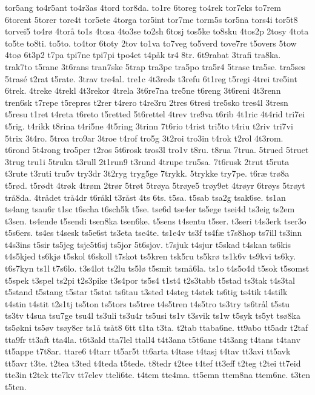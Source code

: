{tor5ang
to4r5ant
to4r3as
4tord
tor8da.
to1re
6toreg
to4rek
tor7eks
to7rem
6torent
5torer
tore4t
tor5ete
4torga
tor5int
tor7me
torm5s
tor5na
tors4i
tor5t8
torvei5
to4rø
4torå
to1s
4tosa
4to3se
to2sh
6tosj
tos5ke
to8sku
4tos2p
2tosy
4tota
to5te
to8ti.
to5to.
to4tor
6toty
2tov
to1va
to7veg
to5verd
tove7re
t5overs
5tow
4toø
6t3p2
t7pa
tpi7ne
tpi7pi
tpo4et
t4påk
tr4
8tr.
6t9rabat
3trafi
tra8ka.
trak7to
t5rane
3t6rans
tran7ske
5trap
tra3pe
tra5po
tra5r4
5trase
tra5se.
tra5ses
5trasé
t2rat
t5rate.
3trav
tre4al.
tre1c
4t3reds
t3refu
6t1reg
t5regi
4trei
tre5int
6trek.
4treke
4trekl
4t3rekor
4trela
3t6re7na
tre5ne
t6reng
3t6reni
4t3renn
tren6sk
t7repe
t5repres
t2rer
t4rero
t4re3ru
2tres
6tresi
tre5sko
tres4l
3tresn
t5resu
t1ret
t4reta
t6reto
t5retted
5t6rettel
4trev
tre9va
t6rib
4t1ric
4t4rid
tri7ei
t5rig.
t4rikk
t8rina
t4ri5ne
4t5ring
3trinn
7t6rio
t4rist
tri5to
t4riu
t2riv
tri7vi
5trix
3t4ro.
5troa
tro9ar
3troe
t4rof
tro5g
3t2roi
tro3in
t4rok
t2rol
4t3rom.
t6rond
5t4rong
tro5per
t2ros
5t6rosk
tros3l
tro1v
t8ru.
t8rua
7trua.
5trued
5truet
3trug
tru1i
5trukn
t3rull
2t1run9
t3rund
4trupe
tru5sa.
7t6rusk
2trut
t5ruta
t3rute
t3ruti
tru5v
try3dr
3t2ryg
tryg5ge
7trykk.
5trykke
try7pe.
t6ræ
trø8a
t5rød.
t5rødt
4trøk
4trøm
2trør
5trøt
5trøya
5trøye5
trøy9et
4trøyr
6trøys
5trøyt
trå8da.
4trådet
trå4dr
t6råkl
t3råst
4ts
6ts.
t5sa.
t5sab
tsa2g
tsak6se.
ts1an
ts4ang
tsau6r
t1sc
t6scha
t6sch5k
t5se.
tse6d
tse4er
ts5ege
tsei4d
ts3eig
ts2em
t3sen.
ts4ende
t5sendi
tsen8ka
tsen6ke.
t5sens
t4sentu
t5ser.
t3seri
t4s3erk
tser3o
t5s6ers.
ts4es
t4sesk
ts5e6st
ts3eta
tse4te.
ts1e4v
ts3f
ts4fæ
t7s8hop
ts7ill
ts3inn
t4s3ins
t5sir
ts5jeg
tsje5t6sj
ts5jor
5t6sjov.
t7sjuk
t4sjur
t5skad
t4skan
ts6kis
t4s5kjed
ts6kjø
t5skol
t6skoll
t7skot
ts5kren
tsk5ru
ts5krø
ts1k6v
ts9kvi
ts6ky.
t6s7kyn
ts1l
t7s6lo.
t3s4lot
ts2lu
ts5lø
t5smit
tsmå6la.
ts1o
t4s5o4d
t5sok
t5somst
t5spek
t3spel
ts2pi
t2s3pike
t3s4por
ts5s4
t1st4
t2s3tabb
t5stad
ts3tak
t4s3tal
t5stand
t5stang
t5star
t5stat
ts6tau
t3sted
t4steg
t4stek
ts6tig
ts4tik
t4stilk
t4stin
t4stit
t2s1tj
ts5ton
ts5tors
ts5tree
t4s5tren
t4s5tro
ts3try
ts6trål
t5stu
ts3tv
t4sua
tsu7ge
tsu4l
ts3uli
ts3u4r
ts5usi
ts1v
t3svik
ts1w
t5syk
ts5yt
tsø8ka
ts5økni
ts5øv
tsøy8er
ts1å
tsåt8
6tt
t1ta
t3ta.
t2tab
ttaba6ne.
tt9abo
tt5adr
t2taf
tta9fr
tt3aft
tta4la.
t6t3ald
tta7lel
ttall4
t4t3ana
t5t6ane
t4t3ang
t4tans
t4tanv
tt5appe
t7t8ar.
ttare6
t4tarr
tt5ar5t
tt6arta
t4tase
t4tasj
t4tav
tt3avi
tt5avk
tt5avr
t3te.
t2tea
t3ted
t4teda
t5tede.
t8tedr
t2tee
t4tef
tt3eff
t2teg
t2tei
tt7eid
tte3in
t2tek
tte7kv
tt7elev
tteli6te.
t4tem
tte4ma.
tt5emn
ttem8na
ttem6ne.
t3ten
t5ten.
}
